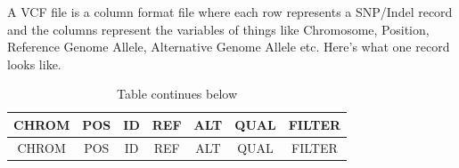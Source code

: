 \documentclass[]{book}
\theoremstyle{definition}
\theoremstyle{definition}
\theoremstyle{definition}
\theoremstyle{remark}
\begin{document}
A VCF file is a column format file where each row represents a SNP/Indel
record and the columns represent the variables of things like
Chromosome, Position, Reference Genome Allele, Alternative Genome Allele
etc. Here's what one record looks like.

\begin{longtable}[]{@{}ccccccc@{}}
\caption{Table continues below}\tabularnewline
\toprule
\begin{minipage}[b]{0.09\columnwidth}\centering
CHROM\strut
\end{minipage} & \begin{minipage}[b]{0.09\columnwidth}\centering
POS\strut
\end{minipage} & \begin{minipage}[b]{0.13\columnwidth}\centering
ID\strut
\end{minipage} & \begin{minipage}[b]{0.07\columnwidth}\centering
REF\strut
\end{minipage} & \begin{minipage}[b]{0.07\columnwidth}\centering
ALT\strut
\end{minipage} & \begin{minipage}[b]{0.08\columnwidth}\centering
QUAL\strut
\end{minipage} & \begin{minipage}[b]{0.10\columnwidth}\centering
FILTER\strut
\end{minipage}\tabularnewline
\midrule
\endfirsthead
\toprule
\begin{minipage}[b]{0.09\columnwidth}\centering
CHROM\strut
\end{minipage} & \begin{minipage}[b]{0.09\columnwidth}\centering
POS\strut
\end{minipage} & \begin{minipage}[b]{0.13\columnwidth}\centering
ID\strut
\end{minipage} & \begin{minipage}[b]{0.07\columnwidth}\centering
REF\strut
\end{minipage} & \begin{minipage}[b]{0.07\columnwidth}\centering
ALT\strut
\end{minipage} & \begin{minipage}[b]{0.08\columnwidth}\centering
QUAL\strut
\end{minipage} & \begin{minipage}[b]{0.10\columnwidth}\centering
FILTER\strut
\end{minipage}\tabularnewline

\end{longtable}
\end{document}
